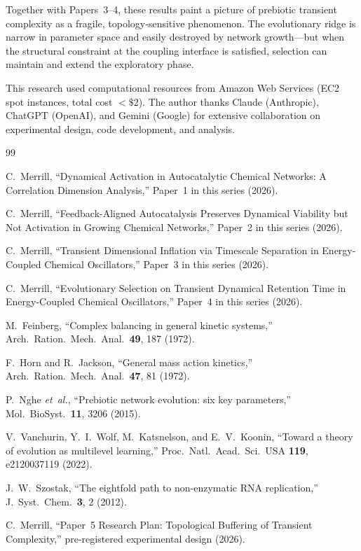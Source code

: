 \documentclass[twocolumn,showpacs,preprintnumbers,amsmath,amssymb,prd,floatfix]{revtex4-2}
\begin{document}
Together with Papers~3--4, these results paint a picture of prebiotic transient complexity as a fragile, topology-sensitive phenomenon. The evolutionary ridge is narrow in parameter space and easily destroyed by network growth---but when the structural constraint at the coupling interface is satisfied, selection can maintain and extend the exploratory phase.

\begin{acknowledgments}
This research used computational resources from Amazon Web Services (EC2 spot instances, total cost $< \$2$). The author thanks Claude (Anthropic), ChatGPT (OpenAI), and Gemini (Google) for extensive collaboration on experimental design, code development, and analysis.
\end{acknowledgments}

\begin{thebibliography}{99}

C.~Merrill, ``Dynamical Activation in Autocatalytic Chemical Networks: A Correlation Dimension Analysis,'' Paper~1 in this series (2026).

C.~Merrill, ``Feedback-Aligned Autocatalysis Preserves Dynamical Viability but Not Activation in Growing Chemical Networks,'' Paper~2 in this series (2026).

C.~Merrill, ``Transient Dimensional Inflation via Timescale Separation in Energy-Coupled Chemical Oscillators,'' Paper~3 in this series (2026).

C.~Merrill, ``Evolutionary Selection on Transient Dynamical Retention Time in Energy-Coupled Chemical Oscillators,'' Paper~4 in this series (2026).

M.~Feinberg, ``Complex balancing in general kinetic systems,'' Arch.\ Ration.\ Mech.\ Anal.\ \textbf{49}, 187 (1972).

F.~Horn and R.~Jackson, ``General mass action kinetics,'' Arch.\ Ration.\ Mech.\ Anal.\ \textbf{47}, 81 (1972).

P.~Nghe \textit{et~al.}, ``Prebiotic network evolution: six key parameters,'' Mol.\ BioSyst.\ \textbf{11}, 3206 (2015).

V.~Vanchurin, Y.~I.~Wolf, M.~Katsnelson, and E.~V.~Koonin, ``Toward a theory of evolution as multilevel learning,'' Proc.\ Natl.\ Acad.\ Sci.\ USA \textbf{119}, e2120037119 (2022).

J.~W.~Szostak, ``The eightfold path to non-enzymatic RNA replication,'' J.\ Syst.\ Chem.\ \textbf{3}, 2 (2012).

C.~Merrill, ``Paper~5 Research Plan: Topological Buffering of Transient Complexity,'' pre-registered experimental design (2026).

\end{thebibliography}
\end{document}
